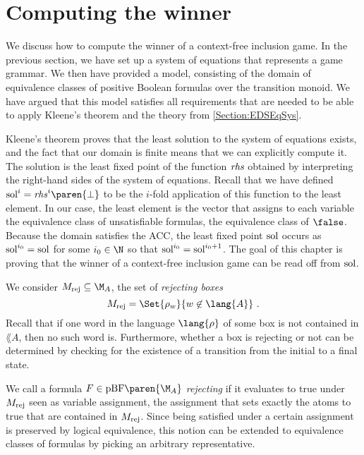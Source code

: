 \documentclass[../../diss.tex]{subfiles}
\begin{document}
\section{Computing the winner}%
\label{Section:CFGamesSoundness}%

We discuss how to compute the winner of a context-free inclusion game.
In the previous section, we have set up a system of equations that represents a game grammar.
We then have provided a model, consisting of the domain of equivalence classes of positive Boolean formulas over the transition monoid.
We have argued that this model satisfies all requirements that are needed to be able to apply Kleene's theorem and the theory from \cref{Section:EDSEqSys}.

Kleene's theorem proves that the least solution to the system of equations exists, and the fact that our domain is finite means that we can explicitly compute it.
The solution is the least fixed point of the function $\mathit{rhs}$ obtained by interpreting the right-hand sides of the system of equations.
Recall that we have defined $\soli{i} = \rhs^{i}\paren{\bot}$ to be the $i$-fold application of this function to the least element.
In our case, the least element is the vector that assigns to each variable the equivalence class of unsatisfiable formulas, \ie the equivalence class of $\false$.
Because the domain satisfies the ACC, the least fixed point $\sol$ occurs as $\soli{i_0} = \sol$ for some $i_0 \in \N$ so that $\text{sol}^{i_0} = \text{sol}^{i_0 + 1}$.
The goal of this chapter is proving that the winner of a context-free inclusion game can be read off from $\sol$.

We consider $\Mrej \subseteq \nfatransmonoid{A}$, the set of \emph{rejecting boxes}
\[
    \Mrej = \Set{ \tbox{w} }{ w \not\in \lang{A}}
    \ .
\]
Recall that if one word in the language $\lang{\tbox}$ of some box is not contained in $\lang{A}$, then no such word is.
Furthermore, whether a box is rejecting or not can be determined by checking for the existence of a transition from the initial to a final state.

We call a formula $F \in \pBF\paren{\nfatransmonoid{A}}$ \emph{rejecting} if it evaluates to true under $M_{\text{rej}}$ seen as variable assignment, \ie the assignment that sets exactly the atoms to true that are contained in $M_{\text{rej}}$.
Since being satisfied under a certain assignment is preserved by logical equivalence, this notion can be extended to equivalence classes of formulas by picking an arbitrary representative.
\end{document}
